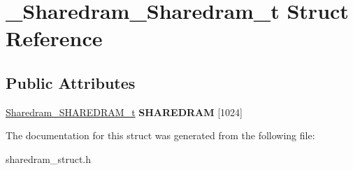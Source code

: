 \hypertarget{struct__Sharedram__Sharedram__t}{\section{\-\_\-\-Sharedram\-\_\-\-Sharedram\-\_\-t Struct Reference}
\label{struct__Sharedram__Sharedram__t}
}
\subsection*{Public Attributes}
\begin{DoxyCompactItemize}
\item 
\hypertarget{struct__Sharedram__Sharedram__t_aac4d11c969ec31a97770bf33595d6158}{\hyperlink{union__Sharedram__SHAREDRAM__t}{Sharedram\-\_\-\-S\-H\-A\-R\-E\-D\-R\-A\-M\-\_\-t} {\bfseries S\-H\-A\-R\-E\-D\-R\-A\-M} \mbox{[}1024\mbox{]}}\label{struct__Sharedram__Sharedram__t_aac4d11c969ec31a97770bf33595d6158}

\end{DoxyCompactItemize}


The documentation for this struct was generated from the following file\-:\begin{DoxyCompactItemize}
\item 
sharedram\-\_\-struct.\-h\end{DoxyCompactItemize}
